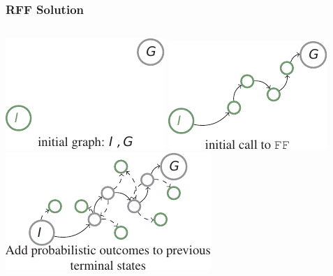 \documentclass{beamer}
\let\origframetitle=\frametitle
\renewcommand\frametitle[1]{\origframetitle{\textbf{\large{\textrm{#1}}}}}
\begin{document}
\begin{frame}
  \frametitle{RFF Solution}

  \begin{columns}
     {\includegraphics[width=\textwidth]{images/rff-1.pdf}}
     {\includegraphics[width=\textwidth]{images/rff-2.pdf}}
     {\includegraphics[width=\textwidth]{images/rff-3.pdf}}

\end{columns}
\end{frame}
\end{document}
